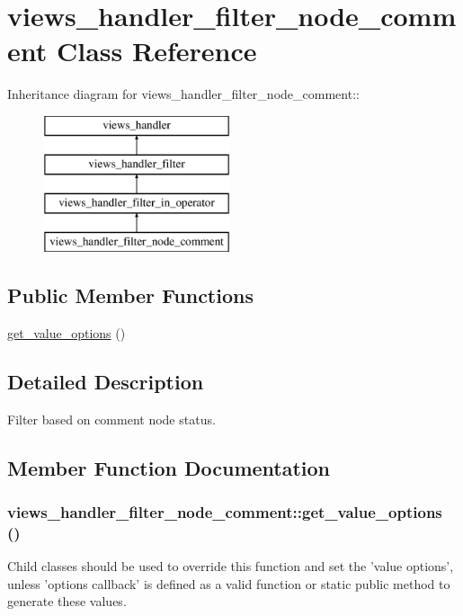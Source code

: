 \hypertarget{classviews__handler__filter__node__comment}{
\section{views\_\-handler\_\-filter\_\-node\_\-comment Class Reference}
\label{classviews__handler__filter__node__comment}
}
Inheritance diagram for views\_\-handler\_\-filter\_\-node\_\-comment::\begin{figure}[H]
\begin{center}
\leavevmode
\includegraphics[height=4cm]{classviews__handler__filter__node__comment}
\end{center}
\end{figure}
\subsection*{Public Member Functions}
\begin{DoxyCompactItemize}
\item 
\hyperlink{classviews__handler__filter__node__comment_a5f547b83a8bc376d88ba58b75777a12e}{get\_\-value\_\-options} ()
\end{DoxyCompactItemize}


\subsection{Detailed Description}
Filter based on comment node status. 

\subsection{Member Function Documentation}
\hypertarget{classviews__handler__filter__node__comment_a5f547b83a8bc376d88ba58b75777a12e}{
\subsubsection[{get\_\-value\_\-options}]{\setlength{\rightskip}{0pt plus 5cm}views\_\-handler\_\-filter\_\-node\_\-comment::get\_\-value\_\-options ()}}
\label{classviews__handler__filter__node__comment_a5f547b83a8bc376d88ba58b75777a12e}
Child classes should be used to override this function and set the 'value options', unless 'options callback' is defined as a valid function or static public method to generate these values.

